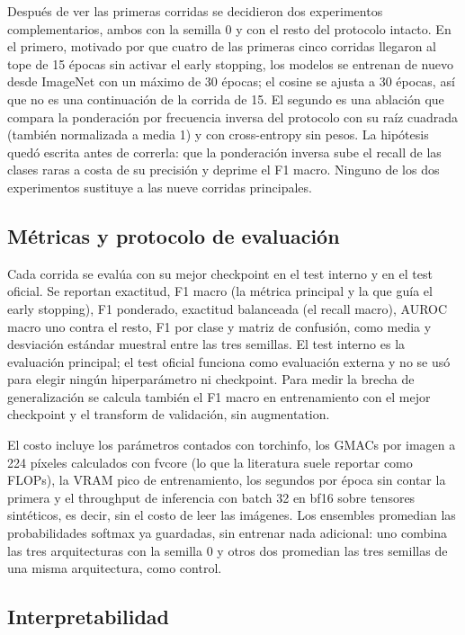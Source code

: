 \documentclass[conference]{IEEEtran}
\begin{document}
Después de ver las primeras corridas se decidieron dos experimentos complementarios, ambos con la semilla 0 y con el resto del protocolo intacto. En el primero, motivado por que cuatro de las primeras cinco corridas llegaron al tope de 15 épocas sin activar el early stopping, los modelos se entrenan de nuevo desde ImageNet con un máximo de 30 épocas; el cosine se ajusta a 30 épocas, así que no es una continuación de la corrida de 15. El segundo es una ablación que compara la ponderación por frecuencia inversa del protocolo con su raíz cuadrada (también normalizada a media 1) y con cross-entropy sin pesos. La hipótesis quedó escrita antes de correrla: que la ponderación inversa sube el recall de las clases raras a costa de su precisión y deprime el F1 macro. Ninguno de los dos experimentos sustituye a las nueve corridas principales.

\subsection{Métricas y protocolo de evaluación}

Cada corrida se evalúa con su mejor checkpoint en el test interno y en el test oficial. Se reportan exactitud, F1 macro (la métrica principal y la que guía el early stopping), F1 ponderado, exactitud balanceada (el recall macro), AUROC macro uno contra el resto, F1 por clase y matriz de confusión, como media y desviación estándar muestral entre las tres semillas. El test interno es la evaluación principal; el test oficial funciona como evaluación externa y no se usó para elegir ningún hiperparámetro ni checkpoint. Para medir la brecha de generalización se calcula también el F1 macro en entrenamiento con el mejor checkpoint y el transform de validación, sin augmentation.

El costo incluye los parámetros contados con torchinfo, los GMACs por imagen a 224 píxeles calculados con fvcore (lo que la literatura suele reportar como FLOPs), la VRAM pico de entrenamiento, los segundos por época sin contar la primera y el throughput de inferencia con batch 32 en bf16 sobre tensores sintéticos, es decir, sin el costo de leer las imágenes. Los ensembles promedian las probabilidades softmax ya guardadas, sin entrenar nada adicional: uno combina las tres arquitecturas con la semilla 0 y otros dos promedian las tres semillas de una misma arquitectura, como control.

\subsection{Interpretabilidad}
\end{document}
